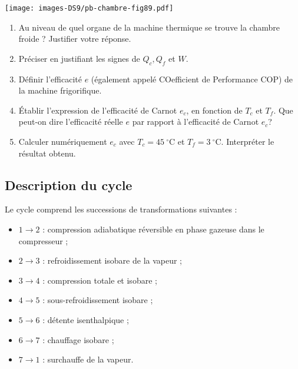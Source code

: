 \documentclass[
  10pt,
  french,
  a4paper,
  DIV=18]{scrartcl}
\providecommand{\tightlist}{%
  \setlength{\itemsep}{0pt}\setlength{\parskip}{0pt}}
\begin{document}
\begin{center}

\texttt{[image: images-DS9/pb-chambre-fig89.pdf]}

\end{center}

\begin{enumerate}
\def\labelenumi{\arabic{enumi}.}
\item
  Au niveau de quel organe de la machine thermique se trouve la chambre
  froide ? Justifier votre réponse.
\item
  Préciser en justifiant les signes de \(Q_c,Q_f\) et \(W\).
\item
  Définir l'efficacité \(e\) (également appelé COefficient de
  Performance COP) de la machine frigorifique.
\item
  Établir l'expression de l'efficacité de Carnot \(e_c\), en fonction de
  \(T_c\) et \(T_f\). Que peut-on dire l'efficacité réelle \(e\) par
  rapport à l'efficacité de Carnot \(e_c\)?
\item
  Calculer numériquement \(e_c\) avec \(T_c = 45\ ^\circ\mathrm{C}\) et
  \(T_f = 3\ ^\circ\mathrm{C}\). Interpréter le résultat obtenu.
\end{enumerate}

\subsection*{Description du cycle}\label{description-du-cycle}

Le cycle comprend les successions de transformations suivantes :

\begin{itemize}
\tightlist
\item
  \(1 \to 2\) : compression adiabatique réversible en phase gazeuse dans
  le compresseur ;
\item
  \(2 \to 3\) : refroidissement isobare de la vapeur ;
\item
  \(3 \to 4\) : compression totale et isobare ;
\item
  \(4 \to 5\) : sous-refroidissement isobare ;
\item
  \(5 \to 6\) : détente isenthalpique ;
\item
  \(6 \to 7\) : chauffage isobare ;
\item
  \(7 \to 1\) : surchauffe de la vapeur.
\end{itemize}
\end{document}

